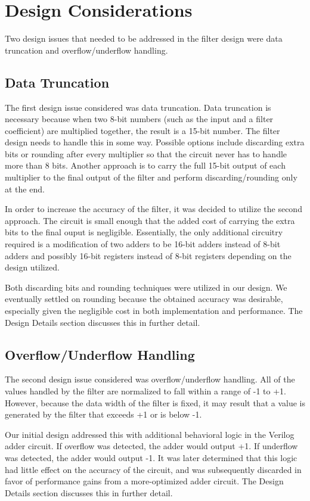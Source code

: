 \section*{Design Considerations}
Two design issues that needed to be addressed in the filter design were data truncation and overflow/underflow handling.

\subsection*{Data Truncation}
The first design issue considered was data truncation. Data truncation is necessary because when two 8-bit numbers (such as the input and a filter coefficient) are multiplied together, the result is a 15-bit number. The filter design needs to handle this in some way. Possible options include discarding extra bits or rounding after every multiplier so that the circuit never has to handle more than 8 bits. Another approach is to carry the full 15-bit output of each multiplier to the final output of the filter and perform discarding/rounding only at the end.

In order to increase the accuracy of the filter, it was decided to utilize the second approach. The circuit is small enough that the added cost of carrying the extra bits to the final ouput is negligible. Essentially, the only additional circuitry required is a modification of two adders to be 16-bit adders instead of 8-bit adders and possibly 16-bit registers instead of 8-bit registers depending on the design utilized. 

Both discarding bits and rounding techniques were utilized in our design. We eventually settled on rounding because the obtained accuracy was desirable, especially given the negligible cost in both implementation and performance. The Design Details section discusses this in further detail.


\subsection*{Overflow/Underflow Handling}
The second design issue considered was overflow/underflow handling. All of the values handled by the filter are normalized to fall within a range of -1 to +1. However, because the data width of the filter is fixed, it may result that a value is generated by the filter that exceeds +1 or is below -1.

Our initial design addressed this with additional behavioral logic in the Verilog adder circuit. If overflow was detected, the adder would output +1. If underflow was detected, the adder would output -1. It was later determined that this logic had little effect on the accuracy of the circuit, and was subsequently discarded in favor of performance gains from a more-optimized adder circuit. The Design Details section discusses this in further detail.
